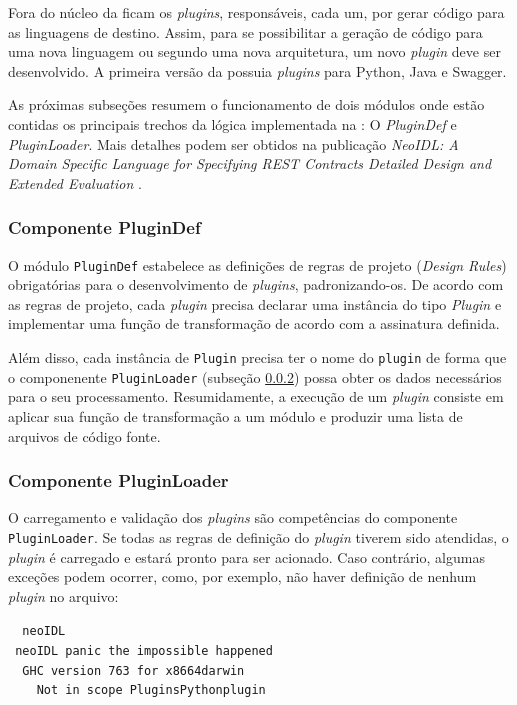 Fora do núcleo da \neoidl{} ficam os \textit{plugins}, responsáveis,
cada um, por gerar código para as linguagens de destino. Assim, para se
possibilitar a geração de código para uma nova linguagem ou segundo uma nova arquitetura, um
novo \textit{plugin} deve ser desenvolvido. A primeira versão da \neoidl{}
possuia \textit{plugins} para Python, Java e Swagger.

As próximas subseções resumem o funcionamento de
dois módulos onde estão contidas os principais trechos da lógica implementada na \neoidl{}: O
\textit{PluginDef} e \textit{PluginLoader}. Mais detalhes podem ser obtidos na
publicação \textit{NeoIDL: A Domain Specific Language for Specifying REST
Contracts Detailed Design and Extended Evaluation} \cite{lima2015neoidl}.
 

\subsubsection{Componente PluginDef}{\label{sec:plugindef}}

O módulo \texttt{PluginDef} estabelece as definições de regras de projeto
(\textit{Design Rules}) obrigatórias para o desenvolvimento de
\textit{plugins}, padronizando-os. De acordo com as regras de projeto, cada
\textit{plugin} precisa declarar uma instância do tipo \emph{Plugin} e implementar uma função de
transformação de acordo com a assinatura definida.

Além disso, cada instância de  
\texttt{Plugin} precisa ter o nome do \texttt{plugin} de forma que o
componenente \texttt{PluginLoader} (subseção \ref{compPluginLoader}) possa obter
os dados necessários para o seu processamento.
Resumidamente, a execução de um \textit{plugin} consiste em aplicar sua função
de transformação a um módulo \neoidl{} e produzir uma lista de
arquivos de código fonte. 


\subsubsection{Componente PluginLoader}
\label{compPluginLoader}

O carregamento e validação dos \textit{plugins} são competências do componente
\texttt{PluginLoader}. Se todas as regras de definição do \textit{plugin}
tiverem sido atendidas, o \textit{plugin} é carregado e estará pronto para ser
 acionado. Caso contrário, algumas exceções podem ocorrer, como, por exemplo, não haver definição de
nenhum \textit{plugin} no arquivo:

\begin{tabbing}\tt
~neoIDL\\
\tt ~neoIDL~panic~the~impossible~happened\\
\tt ~~GHC~version~763~for~x8664darwin\\
\tt ~~~~Not~in~scope~PluginsPythonplugin
\end{tabbing}

